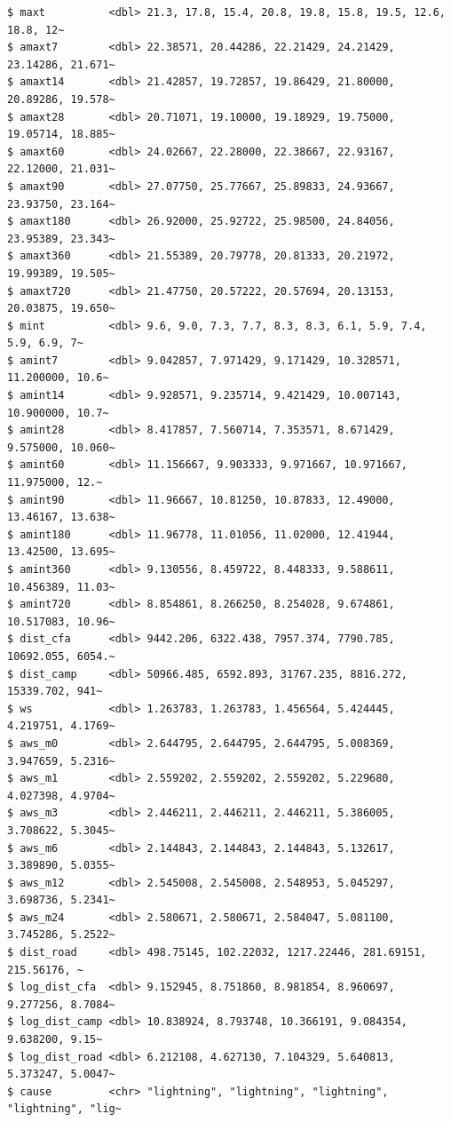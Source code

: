 \documentclass[
  letterpaper,
]{book}
\begin{document}
\begin{verbatim}
$ maxt          <dbl> 21.3, 17.8, 15.4, 20.8, 19.8, 15.8, 19.5, 12.6, 18.8, 12~
$ amaxt7        <dbl> 22.38571, 20.44286, 22.21429, 24.21429, 23.14286, 21.671~
$ amaxt14       <dbl> 21.42857, 19.72857, 19.86429, 21.80000, 20.89286, 19.578~
$ amaxt28       <dbl> 20.71071, 19.10000, 19.18929, 19.75000, 19.05714, 18.885~
$ amaxt60       <dbl> 24.02667, 22.28000, 22.38667, 22.93167, 22.12000, 21.031~
$ amaxt90       <dbl> 27.07750, 25.77667, 25.89833, 24.93667, 23.93750, 23.164~
$ amaxt180      <dbl> 26.92000, 25.92722, 25.98500, 24.84056, 23.95389, 23.343~
$ amaxt360      <dbl> 21.55389, 20.79778, 20.81333, 20.21972, 19.99389, 19.505~
$ amaxt720      <dbl> 21.47750, 20.57222, 20.57694, 20.13153, 20.03875, 19.650~
$ mint          <dbl> 9.6, 9.0, 7.3, 7.7, 8.3, 8.3, 6.1, 5.9, 7.4, 5.9, 6.9, 7~
$ amint7        <dbl> 9.042857, 7.971429, 9.171429, 10.328571, 11.200000, 10.6~
$ amint14       <dbl> 9.928571, 9.235714, 9.421429, 10.007143, 10.900000, 10.7~
$ amint28       <dbl> 8.417857, 7.560714, 7.353571, 8.671429, 9.575000, 10.060~
$ amint60       <dbl> 11.156667, 9.903333, 9.971667, 10.971667, 11.975000, 12.~
$ amint90       <dbl> 11.96667, 10.81250, 10.87833, 12.49000, 13.46167, 13.638~
$ amint180      <dbl> 11.96778, 11.01056, 11.02000, 12.41944, 13.42500, 13.695~
$ amint360      <dbl> 9.130556, 8.459722, 8.448333, 9.588611, 10.456389, 11.03~
$ amint720      <dbl> 8.854861, 8.266250, 8.254028, 9.674861, 10.517083, 10.96~
$ dist_cfa      <dbl> 9442.206, 6322.438, 7957.374, 7790.785, 10692.055, 6054.~
$ dist_camp     <dbl> 50966.485, 6592.893, 31767.235, 8816.272, 15339.702, 941~
$ ws            <dbl> 1.263783, 1.263783, 1.456564, 5.424445, 4.219751, 4.1769~
$ aws_m0        <dbl> 2.644795, 2.644795, 2.644795, 5.008369, 3.947659, 5.2316~
$ aws_m1        <dbl> 2.559202, 2.559202, 2.559202, 5.229680, 4.027398, 4.9704~
$ aws_m3        <dbl> 2.446211, 2.446211, 2.446211, 5.386005, 3.708622, 5.3045~
$ aws_m6        <dbl> 2.144843, 2.144843, 2.144843, 5.132617, 3.389890, 5.0355~
$ aws_m12       <dbl> 2.545008, 2.545008, 2.548953, 5.045297, 3.698736, 5.2341~
$ aws_m24       <dbl> 2.580671, 2.580671, 2.584047, 5.081100, 3.745286, 5.2522~
$ dist_road     <dbl> 498.75145, 102.22032, 1217.22446, 281.69151, 215.56176, ~
$ log_dist_cfa  <dbl> 9.152945, 8.751860, 8.981854, 8.960697, 9.277256, 8.7084~
$ log_dist_camp <dbl> 10.838924, 8.793748, 10.366191, 9.084354, 9.638200, 9.15~
$ log_dist_road <dbl> 6.212108, 4.627130, 7.104329, 5.640813, 5.373247, 5.0047~
$ cause         <chr> "lightning", "lightning", "lightning", "lightning", "lig~
\end{verbatim}
\end{document}
